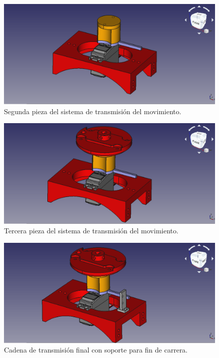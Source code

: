 \begin{figure}[H]
    \centering 
    \includegraphics[width=1\linewidth]{pictures/MotorMasSegundaPieza.png}
    \caption{Segunda pieza del sistema de transmisión del movimiento.}
    \label{fig:segunda_pieza_sistema_transmision}
\end{figure}

\begin{figure}[H]
    \centering 
    \includegraphics[width=1\linewidth]{pictures/MotorMasTerceraPieza.png}
    \caption{Tercera pieza del sistema de transmisión del movimiento.}
    \label{fig:tercera_pieza_sistema_transmision}
\end{figure}

\begin{figure}[H]
    \centering 
    \includegraphics[width=1\linewidth]{pictures/FinalDeCarrera.png}
    \caption{Cadena de transmisión final con soporte para fin de carrera.}
    \label{fig:sistema_transmision_fin_carrera}
\end{figure}


